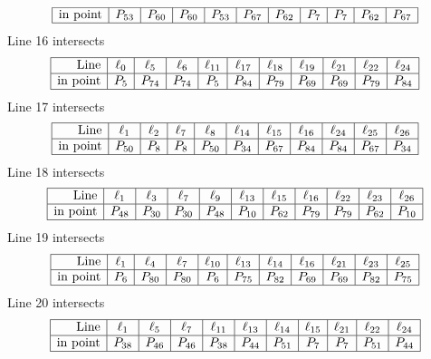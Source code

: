 \documentclass{article}
\begin{document}
{$$\begin{array}{|r*{10}{|c}|}
\hline
\mbox{in point}  & P_{53} & P_{60} & P_{60} & P_{53} & P_{67} & P_{62} & P_{7} & P_{7} & P_{62} & P_{67}\\
\hline
\end{array}
$$
Line 16 intersects 
$$
\begin{array}{|r*{10}{|c}|}
\hline
\mbox{Line}  & \ell_{0} & \ell_{5} & \ell_{6} & \ell_{11} & \ell_{17} & \ell_{18} & \ell_{19} & \ell_{21} & \ell_{22} & \ell_{24}\\
\hline
\mbox{in point}  & P_{5} & P_{74} & P_{74} & P_{5} & P_{84} & P_{79} & P_{69} & P_{69} & P_{79} & P_{84}\\
\hline
\end{array}
$$
Line 17 intersects 
$$
\begin{array}{|r*{10}{|c}|}
\hline
\mbox{Line}  & \ell_{1} & \ell_{2} & \ell_{7} & \ell_{8} & \ell_{14} & \ell_{15} & \ell_{16} & \ell_{24} & \ell_{25} & \ell_{26}\\
\hline
\mbox{in point}  & P_{50} & P_{8} & P_{8} & P_{50} & P_{34} & P_{67} & P_{84} & P_{84} & P_{67} & P_{34}\\
\hline
\end{array}
$$
Line 18 intersects 
$$
\begin{array}{|r*{10}{|c}|}
\hline
\mbox{Line}  & \ell_{1} & \ell_{3} & \ell_{7} & \ell_{9} & \ell_{13} & \ell_{15} & \ell_{16} & \ell_{22} & \ell_{23} & \ell_{26}\\
\hline
\mbox{in point}  & P_{48} & P_{30} & P_{30} & P_{48} & P_{10} & P_{62} & P_{79} & P_{79} & P_{62} & P_{10}\\
\hline
\end{array}
$$
Line 19 intersects 
$$
\begin{array}{|r*{10}{|c}|}
\hline
\mbox{Line}  & \ell_{1} & \ell_{4} & \ell_{7} & \ell_{10} & \ell_{13} & \ell_{14} & \ell_{16} & \ell_{21} & \ell_{23} & \ell_{25}\\
\hline
\mbox{in point}  & P_{6} & P_{80} & P_{80} & P_{6} & P_{75} & P_{82} & P_{69} & P_{69} & P_{82} & P_{75}\\
\hline
\end{array}
$$
Line 20 intersects 
$$
\begin{array}{|r*{10}{|c}|}
\hline
\mbox{Line}  & \ell_{1} & \ell_{5} & \ell_{7} & \ell_{11} & \ell_{13} & \ell_{14} & \ell_{15} & \ell_{21} & \ell_{22} & \ell_{24}\\
\hline
\mbox{in point}  & P_{38} & P_{46} & P_{46} & P_{38} & P_{44} & P_{51} & P_{7} & P_{7} & P_{51} & P_{44}\\
\hline
\end{array}
$$}
\end{document}
